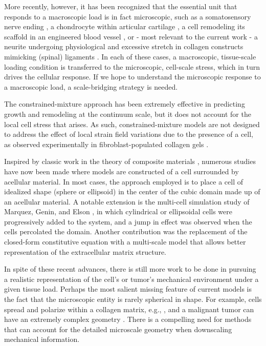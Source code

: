 \documentclass[]{interact}
\begin{document}
More recently, however, it has been recognized that the essential unit that responds to a macroscopic load is in fact microscopic, such as a somatosensory nerve ending \citep{Quindlen:2016ik}, a chondrocyte within articular cartilage \citep{Guilak:2000ir}, a cell remodeling its scaffold in an engineered blood vessel \citep{Isenberg:2006cg,Syedain:2017br}, or - most relevant to the current work - a neurite undergoing physiological and excessive stretch in collagen constructs mimicking (spinal) ligaments \citep{Sperry:2017ez,Zhang:2017gr}. In each of these cases, a macroscopic, tissue-scale loading condition is transferred to the microscopic, cell-scale stress, which in turn drives the cellular response. If we hope to understand the microscopic response to a macroscopic load, a scale-bridging strategy is needed.

The constrained-mixture approach \citep{Humphrey:2002ga} has been extremely effective in predicting growth and remodeling at the continuum scale, but it does not account for the local cell stress that arises. As such, constrained-mixture models are not designed to address the effect of local strain field variations due to the presence of a cell, as observed experimentally in fibroblast-populated collagen gels \citep{Pizzo:2005hv}. 

Inspired by classic work in the theory of composite materials \citep{Hashin:1962tm}, numerous studies have now been made where models are constructed of a cell surrounded by acellular material. In most cases, the approach employed is to place a cell of idealized shape (sphere or ellipsoid) in the center of the cubic domain made up of an acellular material. A notable extension is the multi-cell simulation study of Marquez, Genin, and Elson \citep{Marquez:2010dm}, in which cylindrical or ellipsoidal cells were progressively added to the system, and a jump in effect was observed when the cells percolated the domain.  Another contribution \citep{Lai:2013fp} was the replacement of the closed-form constitutive equation with a multi-scale model that allows better representation of the extracellular matrix structure.

In spite of these recent advances, there is still more work to be done in pursuing a realistic representation of the cell's or tumor's mechanical environment under a given tissue load. Perhaps the most salient missing feature of current models is the fact that the microscopic entity is rarely spherical in shape.  For example, cells spread and polarize within a collagen matrix, e.g., \citep{Guido:1993cm,Friedl:1998dl}, and a malignant tumor can have an extremely complex geometry \citep{Cristini:2003ja}. There is a compelling need for methods that can account for the detailed microscale geometry when downscaling mechanical information.
\end{document}
